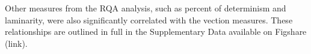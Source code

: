 \documentclass[11pt]{article}
\begin{document}
\begin{linenumbers}
Other measures from the RQA analysis, such as percent of determinism and laminarity, were also significantly correlated with the vection measures. These relationships are outlined in full in the Supplementary Data available on Figshare (link). 

%
%
%
%



\end{linenumbers}
\end{document}
